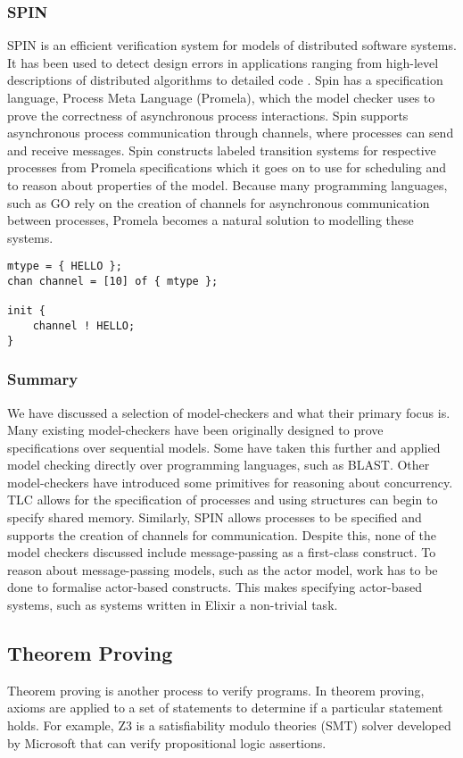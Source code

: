 \subsubsection*{\textbf{SPIN}}
SPIN is an efficient verification system for models of distributed software systems. It has been used to detect design errors in applications ranging from high-level descriptions of distributed algorithms to detailed code \cite{spin}. Spin has a specification language, Process Meta Language (Promela), which the model checker uses to prove the correctness of asynchronous process interactions. Spin supports asynchronous process communication through channels, where processes can send and receive messages. Spin constructs labeled transition systems for respective processes from Promela specifications which it goes on to use for scheduling and to reason about properties of the model. Because many programming languages, such as GO \cite{go} rely on the creation of channels for asynchronous communication between processes, Promela becomes a natural solution to modelling these systems.
\begin{lstlisting}[caption={Example of a Promela specification that enqueues a message in a channel}]
mtype = { HELLO };
chan channel = [10] of { mtype };

init {
    channel ! HELLO;
}
\end{lstlisting}
\subsubsection{Summary}
We have discussed a selection of model-checkers and what their primary focus is. Many existing model-checkers have been originally designed to prove specifications over sequential models. Some have taken this further and applied model checking directly over programming languages, such as BLAST. Other model-checkers have introduced some primitives for reasoning about concurrency. TLC allows for the specification of processes and using structures can begin to specify shared memory. Similarly, SPIN allows processes to be specified and supports the creation of channels for communication. Despite this, none of the model checkers discussed include message-passing as a first-class construct. To reason about message-passing models, such as the actor model, work has to be done to formalise actor-based constructs. This makes specifying actor-based systems, such as systems written in Elixir a non-trivial task.
\subsection{Theorem Proving}
Theorem proving is another process to verify programs. In theorem proving, axioms are applied to a set of statements to determine if a particular statement holds. For example, Z3 \cite{z3} is a satisfiability modulo theories (SMT) solver developed by Microsoft that can verify propositional logic assertions.
